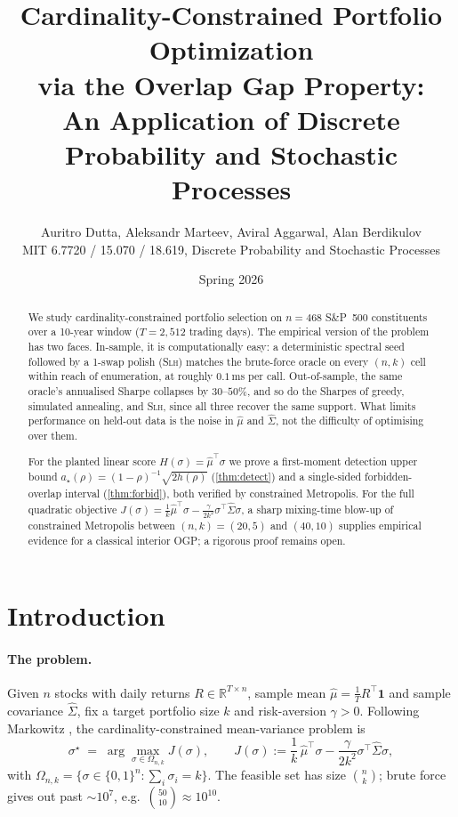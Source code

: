 \documentclass[11pt]{article}
\title{Cardinality-Constrained Portfolio Optimization \\
  via the Overlap Gap Property: \\
  An Application of Discrete Probability and Stochastic Processes}
\author{Auritro Dutta, Aleksandr Marteev, Aviral Aggarwal, Alan Berdikulov \\
  MIT 6.7720 / 15.070 / 18.619, Discrete Probability and Stochastic Processes}
\date{Spring 2026}
\begin{document}
\maketitle

\begin{abstract}
We study cardinality-constrained portfolio selection on $n=468$ S\&P~500 constituents
over a 10-year window ($T=2{,}512$ trading days). The empirical version of the problem
has two faces. In-sample, it is computationally easy: a deterministic spectral seed
followed by a 1-swap polish (\textsc{Slh}) matches the brute-force oracle on every
$(n,k)$ cell within reach of enumeration, at roughly $0.1$\,ms per call. Out-of-sample,
the same oracle's annualised Sharpe collapses by $30$--$50\%$, and so do the Sharpes of
greedy, simulated annealing, and \textsc{Slh}, since all three recover the same support.
What limits performance on held-out data is the noise in $\hat\mu$ and $\hat\Sigma$, not
the difficulty of optimising over them.

For the planted linear score $H(\sigma)=\hat\mu^\top\sigma$ we prove a first-moment
detection upper bound $a_\star(\rho)= (1-\rho)^{-1}\sqrt{2 h(\rho)}$
(\cref{thm:detect}) and a single-sided forbidden-overlap interval
(\cref{thm:forbid}), both verified by constrained Metropolis. For the full quadratic
objective $J(\sigma)=\tfrac{1}{k}\hat\mu^\top\sigma-\tfrac{\gamma}{2k^2}\sigma^\top
\hat\Sigma\sigma$, a sharp mixing-time blow-up of constrained Metropolis between
$(n,k)=(20,5)$ and $(40,10)$ supplies empirical evidence for a classical interior OGP;
a rigorous proof remains open.
\end{abstract}

\section{Introduction}\label{sec:intro}

\paragraph{The problem.} Given $n$ stocks with daily returns $R\in\mathbb R^{T\times n}$,
sample mean $\hat\mu = \tfrac1T R^\top\mathbf 1$ and sample covariance $\hat\Sigma$, fix a
target portfolio size $k$ and risk-aversion $\gamma>0$. Following Markowitz \cite{markowitz},
the cardinality-constrained mean-variance problem is
\begin{equation}\label{eq:problem-intro}
  \sigma^\star \;=\; \arg\max_{\sigma\in\Omega_{n,k}} J(\sigma),
  \qquad J(\sigma) := \frac{1}{k}\,\hat\mu^\top\sigma - \frac{\gamma}{2k^2}\sigma^\top\hat\Sigma\sigma,
\end{equation}
with $\Omega_{n,k}=\{\sigma\in\{0,1\}^n:\sum_i\sigma_i=k\}$. The feasible set has size
$\binom{n}{k}$; brute force gives out past $\sim\!10^7$, e.g.\ $\binom{50}{10}\approx 10^{10}$.
\end{document}
